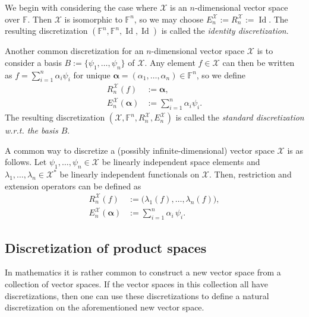 \documentclass[a4paper]{paper}
\makeatletter
\newcommand{\Spc}[1]{\mathscr{#1}}
\newcommand{\Field}{\mathbb{F}}
\newcommand*{\EXT}[2]{\ensuremath{E_{#1}^{#2}}}
\newcommand*{\REST}[2]{\ensuremath{R_{#1}^{#2}}}
\newcommand*{\RnX}{\ensuremath{\REST{n}{\Spc{X}}}}
\newcommand*{\EnX}{\ensuremath{\EXT{n}{\Spc{X}}}}
\DeclareMathOperator{\Id}{Id}
\newcommand{\wrt}{{w.r.t.}\@\xspace}
\newcommand{\valpha}{\boldsymbol{\alpha}}
\makeatother
\begin{document}
\begin{examp}
 We begin with considering the case where $\Spc{X}$ is an $n$-dimensional vector space over $\Field$. Then $\Spc{X}$ is 
 isomorphic to $\Field^{n}$, so we may choose $\EnX:=\RnX:=\Id$. The resulting discretization $( \Field^n, \Field^n, 
\Id, \Id )$ is called 
 the \emph{identity discretization}. 
\end{examp}

\begin{examp}
 Another common discretization for an $n$-dimensional vector space $\Spc{X}$ is to consider a basis $B:=\{ 
\psi_1,\ldots, \psi_{n}\}$ 
 of $\Spc{X}$. Any element $f \in \Spc{X}$ can then be written as $f = \sum_{i=1}^n \alpha_i \psi_i$ for unique 
 $\valpha = (\alpha_1, \ldots, \alpha_{n})\in\Field^n$,
 so we define
 \begin{align*}
  \RnX(f) &:= \valpha, \\
  \EnX(\valpha) &:= \sum_{i=1}^n \alpha_i \psi_i. 
 \end{align*}
 The resulting discretization $( \Spc{X}, \Field^{n}, \RnX, \EnX )$ is called the \emph{standard discretization \wrt 
the basis $B$}.
\end{examp}

\begin{examp}
 A common way to discretize a (possibly infinite-dimensional) vector space $\Spc{X}$ is as follows. Let 
 $\psi_1, \ldots, \psi_n \in \Spc{X}$ be linearly independent space elements and $\lambda_1, \ldots, \lambda_n \in 
\Spc{X}^*$ be 
 linearly independent functionals on $\Spc{X}$. Then, restriction and extension operators can be defined as
 \begin{align*}
  \RnX(f) &:= \big( \lambda_1(f), \ldots, \lambda_n(f) \big), \\
  \EnX(\valpha) &:= \sum_{i=1}^n \alpha_i\, \psi_i.
 \end{align*}
\end{examp}


\subsection{Discretization of product spaces}
\label{subsec:product_space_discretization}

In mathematics it is rather common to construct a new vector space from a collection of vector spaces. If the vector 
spaces in this 
collection all have discretizations, then one can use these discretizations to define a natural discretization on the 
aforementioned new 
vector space.
\end{document}
